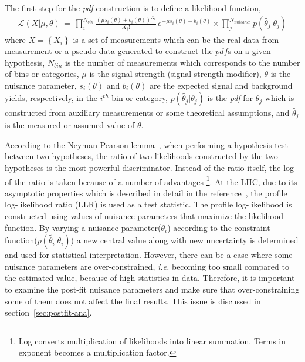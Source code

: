 %
The first step for the \textit{pdf} construction is to define 
a likelihood function,  
\begin{eqnarray} 
\mathcal{L} ( X | \mu, \theta) 
\, = \,
\prod_{i}^{N_{bin}} \frac{ \left( \mu s_i(\theta) + b_i(\theta) \right)^{X_i}}{X_i!} 
\, e^{ - \mu s_i(\theta) - b_i(\theta) }   \times
\prod_{j}^{N_{nuisance}} p\left( \tilde{\theta_j} | \theta_j \right)
\end{eqnarray}
where $X=\left\{X_i\right\}$ is a set of measurements which can be   
the real data from measurement or a pseudo-data generated 
to construct the $pdf$s on a given hypothesis, $N_{bin}$ is the number of 
measurements which corresponds to the number of bins or categories, 
$\mu$ is the signal strength (signal strength modifier),
$\theta$ is the nuisance parameter, 
$s_i(\theta)$ and $b_i(\theta)$ are the expected signal and background 
yields, respectively, in the $i^{th}$ bin or category,
$p\left( \tilde{\theta_j} | \theta_j \right)$ is the \textit{pdf} for 
$\theta_j$ which is constructed from auxiliary measurements or some theoretical  
assumptions, and $\tilde{\theta_j}$ is the measured or assumed value of $\theta$. 

%
According to the Neyman-Pearson lemma~\cite{neymanpearson}, 
when performing a hypothesis test between two hypotheses,
the ratio of two likelihoods constructed by the two hypotheses
is the most powerful discriminator. Instead of the ratio itself, 
the log of the ratio is taken because of a number of advantages
\footnote{Log converts multiplication of likelihoods into linear summation. 
Terms in exponent becomes a multiplication factor.}.  
At the LHC, due to its asymptotic properties which is described in detail 
in the reference~\cite{cowan_asimov}, 
the profile log-likelihood ratio (LLR) is used as a test statistic.    
The profile log-likelihood is constructed using values of nuisance parameters 
that maximize the likelihood function. By varying a nuisance parameter($\theta_i$)
according to the constraint function($p\left( \tilde{\theta_i} | \theta_i \right)$) 
a new central value along with new uncertainty is determined and used 
for statistical interpretation. However, there can be a case where 
some nuisance parameters are over-constrained, \textit{i.e.} becoming too 
small compared to the estimated value, because of high statistics in data. 
Therefore, it is important to examine the post-fit nuisance parameters 
and make sure that over-constraining some of them does not affect the final 
results. This issue is discussed in section~\ref{sec:postfit-ana}.


